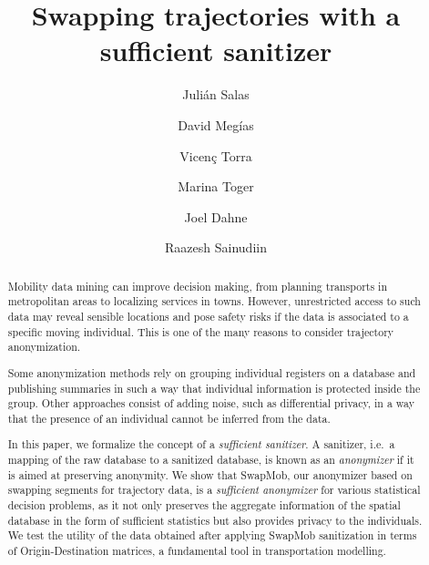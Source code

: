 \documentclass{llncs}
\begin{document}
\title{Swapping trajectories with a sufficient sanitizer}
\author{Juli\'an Salas
\and David Meg\'ias \and Vicen\c{c} Torra \and Marina Toger \and Joel Dahne \and Raazesh Sainudiin}


\maketitle

\begin{abstract}

Mobility data mining can improve decision making, from planning transports in metropolitan areas to localizing services in towns.
However, unrestricted access to such data may reveal sensible locations and pose safety risks if the data is associated to a specific moving individual. This is one of the many reasons to consider trajectory anonymization.


Some anonymization methods rely on grouping individual registers on a database and publishing summaries in such a way that individual information is protected inside the group.
Other approaches consist of adding noise, such as differential privacy, in a way that the presence of an individual cannot be inferred from the data.


In this paper, we formalize the concept of a {\em sufficient sanitizer}. A sanitizer, i.e.~a mapping of the raw database to a sanitized database, is known as an {\em anonymizer} if it is aimed at preserving anonymity.  
We show that SwapMob, our anonymizer based on swapping segments for trajectory data, is a {\em sufficient anonymizer} for various statistical decision problems, as it not only preserves the aggregate information of the spatial database in the form of sufficient statistics but also provides privacy to the individuals. 
We test the utility of the data obtained after applying SwapMob sanitization in terms of Origin-Destination matrices, a fundamental tool in  transportation modelling.

\end{abstract}
\end{document}
